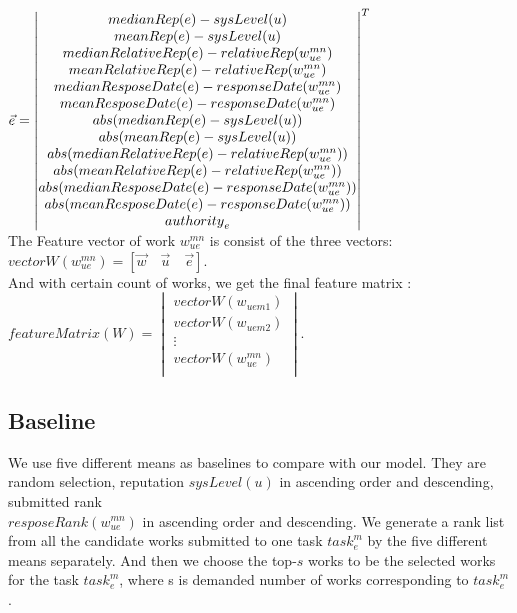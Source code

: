 \documentclass{sig-alternate-05-2015}
\begin{document}
$\vec{e}={\begin{vmatrix} %
medianRep(e)-sysLevel(u)\\
meanRep(e)-sysLevel(u)\\
medianRelativeRep(e)-relativeRep({w}_{ue}^{mn}) \\
meanRelativeRep(e)-relativeRep({w}_{ue}^{mn}) \\
medianResposeDate(e)-responseDate({w}_{ue}^{mn})\\
meanResposeDate(e)-responseDate({w}_{ue}^{mn})\\
abs(medianRep(e)-sysLevel(u))\\
abs(meanRep(e)-sysLevel(u))\\
abs(medianRelativeRep(e)-relativeRep({w}_{ue}^{mn}))\\
abs(meanRelativeRep(e)-relativeRep({w}_{ue}^{mn}))\\
abs(medianResposeDate(e)-responseDate({w}_{ue}^{mn}))\\
abs(meanResposeDate(e)-responseDate({w}_{ue}^{mn}))\\
{authority}_{e}
\end{vmatrix} }^{ T }\\$\\
The Feature vector of work ${w}_{ue}^{mn}$ is consist of the three vectors:\\
$vectorW({w}_{ue}^{mn})=\left[ \vec{w}\quad\vec{u}\quad\vec{e}\right]$. \\
And with certain count of works, we get the final feature matrix : 
$featureMatrix(W)=
{\begin{vmatrix}
vectorW({w}_{uem1})\\
vectorW({w}_{uem2})\\
\vdots\\
vectorW({w}_{ue}^{mn})\\
\end{vmatrix}}$. 
\subsection{Baseline}
We use five different means as baselines to compare with our model. They are random selection, reputation $sysLevel(u)$ in ascending order and descending, submitted rank \\ 
$resposeRank({w}_{ue}^{mn})$ in ascending order and descending. We generate a rank list from all the candidate works submitted to one task ${task}_{e}^{m}$ by the five different means separately. And then we choose the top-$s$ works to be the selected works for the task ${task}_{e}^{m}$, where s is demanded number of works corresponding to ${task}_{e}^{m}$.
\end{document}

